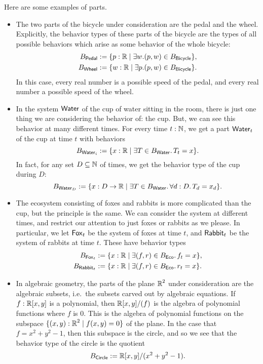 \begin{ex}
Here are some examples of parts.
\begin{itemize}
    \item The two parts of the bicycle under consideration are the pedal and the wheel. Explicitly, the behavior types of these parts of the bicycle are the types of all possible behaviors which arise as some behavior of the whole bicycle:
    \begin{align*}
        B_{\mathsf{{Pedal}}} &:= \{ p : \operatorname{\mathbb{R}} \mid \exists w. (p, w) \in B_{\mathsf{{Bicycle}}}\},\\
        B_{\mathsf{{Wheel}}} &:= \{ w : \operatorname{\mathbb{R}} \mid \exists p. (p, w) \in B_{\mathsf{{Bicycle}}}\}.
    \end{align*}
    In this case, every real number is a possible speed of the pedal, and every real number a possible speed of the wheel.
    
    \item In the system $\mathsf{{Water}}$ of the cup of water sitting in the room, there is just one thing we are considering the behavior of: the cup. But, we can see this behavior at many different times. For every time $t : \operatorname{\mathbb{N}}$, we get a part $\mathsf{{Water}}_t$ of the cup at time $t$ with behaviors
    $$B_{\mathsf{{Water}}_i} := \{ x : \operatorname{\mathbb{R}} \mid \exists T \in B_{\mathsf{{Water}}}.\, T_t = x\}.$$
    In fact, for any set $D \subseteq \operatorname{\mathbb{N}}$ of times, we get the behavior type of the cup during $D$:
    $$B_{\mathsf{{Water}}_D} := \{ x : D \to \operatorname{\mathbb{R}} \mid \exists T \in B_{\mathsf{{Water}}}.\, \forall d : D.\, T_d = x_d\}.$$
    
    \item The ecosystem consisting of foxes and rabbits is more complicated than the cup, but the principle is the same. We can consider the system at different times, and restrict our attention to just foxes or rabbits as we please. In particular, we let $\mathsf{{Fox}}_t$ be the system of foxes at time $t$, and $\mathsf{{Rabbit}}_t$ be the system of rabbits at time $t$. These have behavior types
    \begin{align*}
        B_{\mathsf{{Fox}}_t} &:= \{ x : \operatorname{\mathbb{R}} \mid \exists (f, r) \in B_{\mathsf{{Eco}}}.\, f_t = x\},\\
        B_{\mathsf{{Rabbit}}_t} &:= \{ x : \operatorname{\mathbb{R}} \mid \exists (f, r) \in B_{\mathsf{{Eco}}}.\, r_t = x\}.
    \end{align*}
    
    \item In algebraic geometry, the parts of the plane $\operatorname{\mathbb{R}}^2$ under consideration are the algebraic subsets, i.e.\ the subsets carved out by algebraic equations. If $f : \operatorname{\mathbb{R}}[x, y]$ is a polynomial, then $\operatorname{\mathbb{R}}[x, y]/(f)$ is the algebra of polynomial functions where $f$ is $0$. This is the algebra of polynomial functions on the subspace $\{(x, y) : \operatorname{\mathbb{R}}^2 \mid f(x, y) = 0\}$ of the plane. In the case that $f = x^2 + y^2 - 1$, then this subspace is the circle, and so we see that the behavior type of the circle is the quotient
    $$B_{\mathsf{{Circle}}} := \operatorname{\mathbb{R}}[x, y]/(x^2 + y^2 - 1).$$
    
\end{itemize}
\end{ex}

